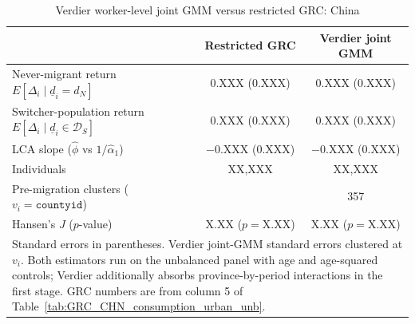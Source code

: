 \begin{table}[ht]
\centering
\small
\caption{Verdier worker-level joint GMM versus restricted GRC: China}
\label{tab:verdier_robust_joint_gmm_CHN}
\begin{tabular}{lcc}
\hline\hline
 & Restricted GRC & Verdier joint GMM \\
\hline
Never-migrant return $E[\Delta_i \mid \underline d_i = d_N]$ & 0.XXX (0.XXX) & 0.XXX (0.XXX) \\
Switcher-population return $E[\Delta_i \mid \underline d_i \in \mathcal D_S]$ & 0.XXX (0.XXX) & 0.XXX (0.XXX) \\
LCA slope ($\hat\phi$ vs $1/\hat\alpha_1$) & $-$0.XXX (0.XXX) & $-$0.XXX (0.XXX) \\
\hline
Individuals & XX,XXX & XX,XXX \\
Pre-migration clusters ($v_i = \texttt{countyid}$) & & 357 \\
Hansen's $J$ ($p$-value) & X.XX ($p = $X.XX) & X.XX ($p = $X.XX) \\
\hline\hline
\multicolumn{3}{p{0.92\linewidth}}{\footnotesize Standard errors in parentheses. Verdier joint-GMM standard errors clustered at $v_i$. Both estimators run on the unbalanced panel with age and age-squared controls; Verdier additionally absorbs province-by-period interactions in the first stage. GRC numbers are from column 5 of Table~\ref{tab:GRC_CHN_consumption_urban_unb}.} \\
\end{tabular}
\end{table}

